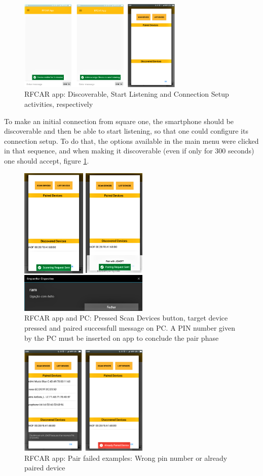 \begin{figure}[!ht]
\centering
\includegraphics[width=0.7\textwidth]{img/bt_disc_list_setup.png}
\caption{\label{fig:bt_disc_list_setup}RFCAR app: Discoverable, Start Listening and Connection Setup activities, respectively}
\end{figure}
%
To make an initial connection from square one, the smartphone should be discoverable and then be able to start listening, so that one could configure its connection setup. To do that, the options available in the main menu were clicked in that sequence, and when making it discoverable (even if only for 300 seconds) one should accept, figure \ref{fig:bt_disc_list_setup}.
\newpage
%
\begin{figure}[!ht]
\centering
\includegraphics[width=0.55\textwidth]{img/bt_con_scan_pair_suc.png}
\caption{\label{fig:bt_con_scan_pair_suc}RFCAR app and PC: Pressed Scan Devices button, target device pressed and paired successfull message on PC. A PIN number given by the PC must be inserted on app to conclude the pair phase}
\end{figure}
%
\begin{figure}[!hbt]
\centering
\includegraphics[width=0.55\textwidth]{img/bt_failed_pair.png}
\caption{\label{fig:bt_failed_pair}RFCAR app: Pair failed examples: Wrong pin number or already paired device}
\end{figure}
